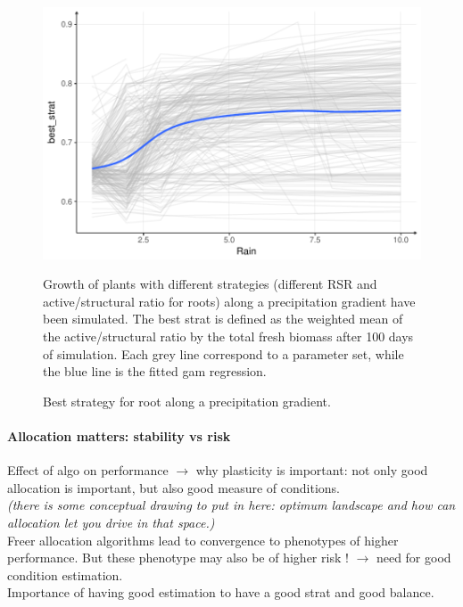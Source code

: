 \documentclass[review]{elsarticle}
\begin{document}
\begin{figure}
\includegraphics[width = \textwidth]{./Figures/best_strat_rain_gradient.pdf}
\caption{Best strategy for root along a precipitation gradient.}
Growth of plants with different strategies (different RSR and active/structural ratio for roots) along a precipitation gradient have been simulated. The best strat is defined as the weighted mean of the active/structural ratio by the total fresh biomass after 100 days of simulation. Each grey line correspond to a parameter set, while the blue line is the fitted gam regression.
\end{figure}



\paragraph{Allocation matters: stability vs risk}
Effect of algo on performance 
$\rightarrow$ why plasticity is important: not only good allocation is important, but also good measure of conditions.\\
\textit{(there is some conceptual drawing to put in here: optimum landscape and how can allocation let you drive in that space.)}\\

Freer allocation algorithms lead to convergence to phenotypes of higher performance. But these phenotype may also be of higher risk ! $\rightarrow $ need for good condition estimation.\\

Importance of having good estimation to have a good strat and good balance.\\
\end{document}
